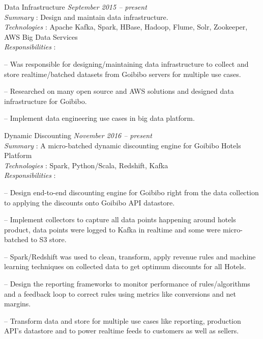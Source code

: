 \documentclass[margin,line]{resume}
\begin{document}
\begin{resume}
Data Infrastructure				 				\hfill \textit{September 2015  -- present} \\ 
\textit{Summary} : Design and maintain data infrastructure. \\
      \textit{Technologies} : Apache Kafka, Spark, HBase, Hadoop, Flume, Solr, Zookeeper, AWS Big Data Services \\
\textit{Responsibilities} : 
     	 	\begin{list2}
         \item[--] Was responsible for designing/maintaining data infrastructure to collect and store realtime/batched datasets from Goibibo servers for multiple use cases.
	\item[--] Researched on many open source and AWS solutions and designed data infrastructure for Goibibo. 
	\item[--] Implement data engineering use cases in big data platform.
	\end{list2}

Dynamic Discounting				 \hfill \textit{November 2016 -- present} \\
\textit{Summary} :  A micro-batched dynamic discounting engine for Goibibo Hotels Platform	 \\
      \textit{Technologies} : Spark, Python/Scala, Redshift, Kafka \\
      \textit{Responsibilities} : 

\begin{list2}
\item[--] Design end-to-end discounting engine for Goibibo right from the data collection to applying the discounts onto Goibibo API datastore.
\item[--] Implement collectors to capture all data points happening around hotels product, data points were logged to Kafka in realtime and some were micro-batched to S3 store.
\item[--] Spark/Redshift was used to clean, transform, apply revenue rules and machine learning techniques on collected data to get optimum discounts for all Hotels.
\item[--] Design the reporting frameworks to monitor performance of rules/algorithms and a feedback loop to correct rules using metrics like conversions and net margins. 
\item[--] Transform data and store for multiple use cases like reporting, production API's datastore and to power realtime feeds to customers as well as sellers.
\end{list2}
	

\end{resume}
\end{document}
